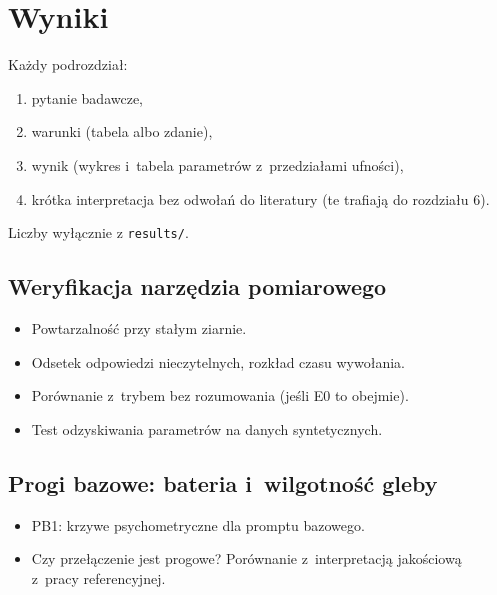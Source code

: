 
\chapter{Wyniki}
\label{ch:wyniki}

\begin{planroboczy}[ok. 12 s.]
Każdy podrozdział:
\begin{enumerate}
  \item pytanie badawcze,
  \item warunki (tabela albo zdanie),
  \item wynik (wykres i~tabela parametrów z~przedziałami ufności),
  \item krótka interpretacja bez odwołań do literatury (te trafiają do rozdziału 6).
\end{enumerate}

Liczby wyłącznie z \texttt{results/}.
\end{planroboczy}

\section{Weryfikacja narzędzia pomiarowego}
\label{sec:5-1}

\begin{planroboczy}[ok. 1 s.]
\begin{itemize}
  \item Powtarzalność przy stałym ziarnie.
  \item Odsetek odpowiedzi nieczytelnych, rozkład czasu wywołania.
  \item Porównanie z~trybem bez rozumowania (jeśli E0 to obejmie).
  \item Test odzyskiwania parametrów na danych syntetycznych.
\end{itemize}
\end{planroboczy}

\section{Progi bazowe: bateria i~wilgotność gleby}
\label{sec:5-2}

\begin{planroboczy}[ok. 2 s.]
\begin{itemize}
  \item PB1: krzywe psychometryczne dla promptu bazowego.
  \item Czy przełączenie jest progowe? Porównanie z~interpretacją jakościową z~pracy referencyjnej.
\end{itemize}
\end{planroboczy}

